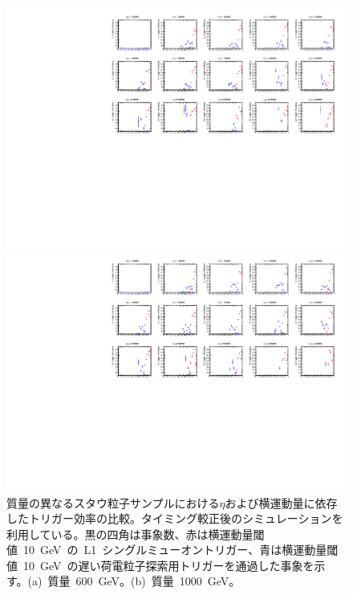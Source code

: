 \begin{figure}[H]
    \begin{minipage}{0.49\hsize}
    \centering   
    \includegraphics[width=\textwidth,page=14]{img/rec/stau_600.pdf}
    \subcaption{}
    \end{minipage}
    \begin{minipage}{0.49\hsize}
    \centering   
    \includegraphics[width=\textwidth,page=14]{img/rec/stau_1000.pdf}
    \subcaption{}
    \end{minipage}
    \caption[質量の異なるスタウ粒子サンプルにおける$\eta$および横運動量に依存したトリガー効率の比較]{質量の異なるスタウ粒子サンプルにおける$\eta$および横運動量に依存したトリガー効率の比較。タイミング較正後のシミュレーションを利用している。黒の四角は事象数、赤は横運動量閾値~10~GeV~の~L1~シングルミューオントリガー、青は横運動量閾値~10~GeV~の遅い荷電粒子探索用トリガーを通過した事象を示す。(a)~質量~600~GeV。(b)~質量~1000~GeV。}\label{fig:tripteta6}
\end{figure}
